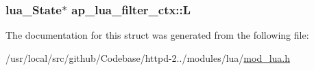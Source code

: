 \subsubsection[{\texorpdfstring{L}{L}}]{\setlength{\rightskip}{0pt plus 5cm}lua\+\_\+\+State$\ast$ ap\+\_\+lua\+\_\+filter\+\_\+ctx\+::L}\hypertarget{structap__lua__filter__ctx_af72dd375b471934b229eeb8c306980c4}{}\label{structap__lua__filter__ctx_af72dd375b471934b229eeb8c306980c4}


The documentation for this struct was generated from the following file\+:\begin{DoxyCompactItemize}
\item 
/usr/local/src/github/\+Codebase/httpd-\/2../modules/lua/\hyperlink{mod__lua_8h}{mod\+\_\+lua.\+h}\end{DoxyCompactItemize}

